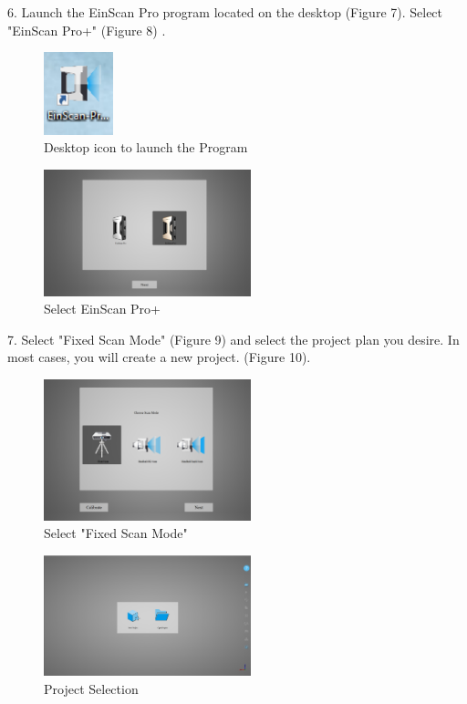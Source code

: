 \newpage

6. Launch the EinScan Pro program located on the desktop (Figure 7). Select "EinScan Pro+" (Figure 8) . 
 
 \begin{figure}[!htp]
\centering
\includegraphics[width=2cm]{Icon}
\caption{Desktop icon to launch the Program}
\label{Image 7}
\end{figure}

\begin{figure}[!htp]
\centering
\includegraphics[width=6cm]{Home_Screen}
\caption{Select EinScan Pro+}
\label{Image 8}
\end{figure}

\newpage

7. Select "Fixed Scan Mode" (Figure 9) and select the project plan you desire. In most cases, you will create a new project. (Figure 10). 

\begin{figure}[!htp]
\centering
\includegraphics[width=6cm]{Choose}
\caption{Select "Fixed Scan Mode"}
\label{Image 9}
\end{figure}

\begin{figure}[!htp]
\centering
\includegraphics[width=6cm]{New_Project}
\caption{Project Selection}
\label{Image 10}
\end{figure}

